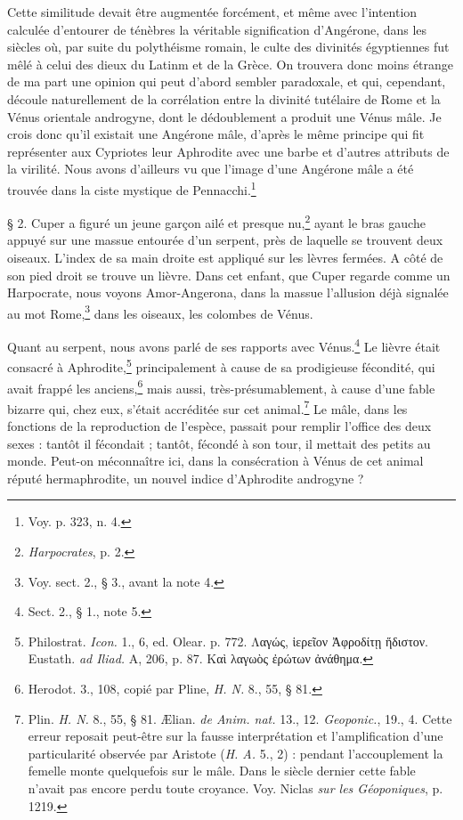 \documentclass[a4paper, 11pt, oneside, polutonikogreek, french]{article}
\begin{document}
Cette similitude devait être augmentée forcément, et même avec l'intention calculée d'entourer de ténèbres la véritable signification d'Angérone, dans les siècles où, par suite du polythéisme romain, le culte des divinités égyptiennes fut mêlé à celui des dieux du Latinm et de la Grèce. On trouvera donc moins étrange de ma part une opinion qui peut d'abord sembler paradoxale, et qui, cependant, découle naturellement de la corrélation entre la divinité tutélaire de Rome et la Vénus orientale androgyne, dont le dédoublement a produit une Vénus mâle. Je crois donc qu'il existait une Angérone mâle, d'après le même principe qui fit représenter aux Cypriotes leur Aphrodite avec une barbe et d'autres attributs de la virilité. Nous avons d'ailleurs vu que l'image d'une Angérone mâle a été trouvée dans la ciste mystique de Pennacchi.\footnote{Voy. p. 323, n. 4.}

§ 2. Cuper a figuré un jeune garçon ailé et presque nu,\footnote{\emph{Harpocrates}, p. 2.} ayant le bras gauche appuyé sur une massue entourée d'un serpent, près de laquelle se trouvent deux oiseaux. L'index de sa main droite est appliqué sur les lèvres fermées. A côté de son pied droit se trouve un lièvre. Dans cet enfant, que Cuper regarde comme un Harpocrate, nous voyons Amor-Angerona, dans la massue l'allusion déjà signalée au mot Rome,\footnote{Voy. sect. 2., § 3., avant la note 4.} dans les oiseaux, les colombes de Vénus.

Quant au serpent, nous avons parlé de ses rapports avec Vénus.\footnote{Sect. 2., § 1., note 5.} Le lièvre était consacré à Aphrodite,\footnote{Philostrat. \emph{Icon.} 1., 6, ed. Olear. p. 772. Λαγώς, ἱερεῖον Ἀφροδίτῃ ἥδιστον. Eustath. \emph{ad Iliad.} A, 206, p. 87. Καὶ λαγωὸς ἐρώτων ἀνάθημα.} principalement à cause de sa prodigieuse fécondité, qui avait frappé les anciens,\footnote{Herodot. 3., 108, copié par Pline, \emph{H. N.} 8., 55, § 81.} mais aussi, très-présumablement, à cause d'une fable bizarre qui, chez eux, s'était accréditée sur cet animal.\footnote{Plin. \emph{H. N.} 8., 55, § 81. Ælian. \emph{de Anim. nat.} 13., 12. \emph{Geoponic.}, 19., 4. Cette erreur reposait peut-être sur la fausse interprétation et l'amplification d'une particularité observée par Aristote (\emph{H. A.} 5., 2) : pendant l'accouplement la femelle monte quelquefois sur le mâle. Dans le siècle dernier cette fable n'avait pas encore perdu toute croyance. Voy. Niclas \emph{sur les Géoponiques}, p. 1219.} Le mâle, dans les fonctions de la reproduction de l'espèce, passait pour remplir l'office des deux sexes : tantôt il fécondait ; tantôt, fécondé à son tour, il mettait des petits au monde. Peut-on méconnaître ici, dans la consécration à Vénus de cet animal réputé hermaphrodite, un nouvel indice d'Aphrodite androgyne ?
\end{document}

